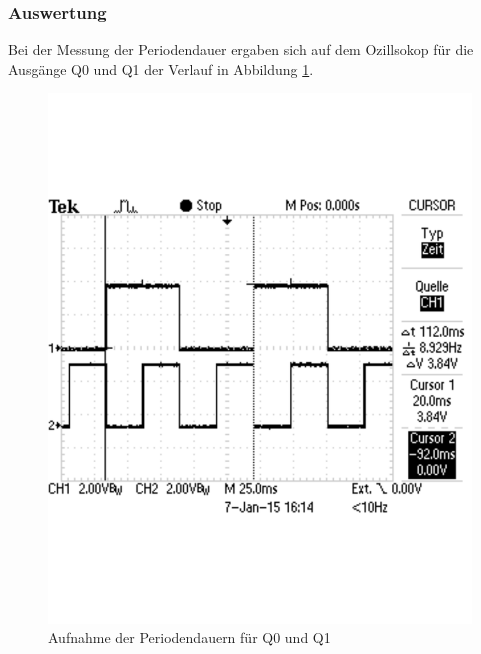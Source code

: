 \documentclass[12pt,a4paper]{article}
\begin{document}
\subsubsection*{Auswertung}

Bei der Messung der Periodendauer ergaben sich auf dem Ozillsokop für die Ausgänge Q0 und Q1 der Verlauf in Abbildung \ref{fig:periode_1}.

\begin{figure}[H] 
  \centering 	
    \includegraphics[trim = 0mm 50mm 0mm 50mm, clip, scale = 0.4]{TEK0012.pdf}
  	\caption[Aufnahme der Periodendauern für Q0 und Q1]{Aufnahme der Periodendauern für Q0 und Q1} 
  \label{fig:periode_1}
\end{figure}
\end{document}
